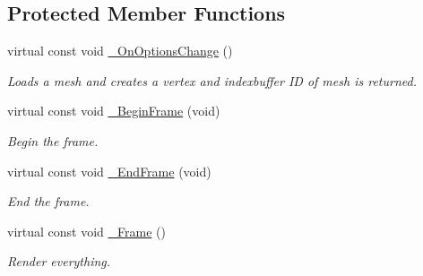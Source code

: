 \subsection*{Protected Member Functions}
\begin{DoxyCompactItemize}
\item 
virtual const void \hyperlink{class_ensum_1_1_graphics_1_1_d3_d12_ad276cdc2f03df54cbbb7d05ac8785df4}{\+\_\+\+On\+Options\+Change} ()
\begin{DoxyCompactList}\small\item\em Loads a mesh and creates a vertex and indexbuffer ID of mesh is returned. \end{DoxyCompactList}\item 
virtual const void \hyperlink{class_ensum_1_1_graphics_1_1_d3_d12_ae258edd552c4bf071a59a140e8f62298}{\+\_\+\+Begin\+Frame} (void)\hypertarget{class_ensum_1_1_graphics_1_1_d3_d12_ae258edd552c4bf071a59a140e8f62298}{}\label{class_ensum_1_1_graphics_1_1_d3_d12_ae258edd552c4bf071a59a140e8f62298}

\begin{DoxyCompactList}\small\item\em Begin the frame. \end{DoxyCompactList}\item 
virtual const void \hyperlink{class_ensum_1_1_graphics_1_1_d3_d12_a102d8e89d1424e4ecefd5750843fa4db}{\+\_\+\+End\+Frame} (void)\hypertarget{class_ensum_1_1_graphics_1_1_d3_d12_a102d8e89d1424e4ecefd5750843fa4db}{}\label{class_ensum_1_1_graphics_1_1_d3_d12_a102d8e89d1424e4ecefd5750843fa4db}

\begin{DoxyCompactList}\small\item\em End the frame. \end{DoxyCompactList}\item 
virtual const void \hyperlink{class_ensum_1_1_graphics_1_1_d3_d12_adcd65422dfc151bd913168c876c11f29}{\+\_\+\+Frame} ()\hypertarget{class_ensum_1_1_graphics_1_1_d3_d12_adcd65422dfc151bd913168c876c11f29}{}\label{class_ensum_1_1_graphics_1_1_d3_d12_adcd65422dfc151bd913168c876c11f29}

\begin{DoxyCompactList}\small\item\em Render everything. \end{DoxyCompactList}\end{DoxyCompactItemize}
